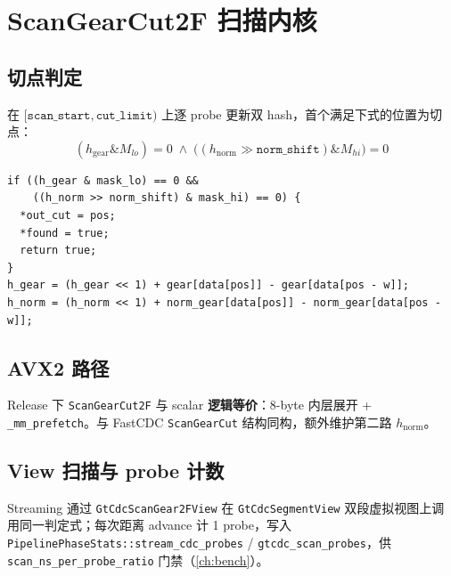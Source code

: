 \chapter{ScanGearCut2F 扫描内核}
\label{ch:scan-cut2f}

\section{切点判定}

在 $[\texttt{scan\_start}, \texttt{cut\_limit})$ 上逐 probe 更新双 hash，首个满足下式的位置为切点：
\begin{equation}
  (h_{\mathrm{gear}} \mathbin{\&} M_{lo}) = 0
  \;\land\;
  \bigl((h_{\mathrm{norm}} \gg \texttt{norm\_shift}) \mathbin{\&} M_{hi}\bigr) = 0
  \label{eq:2f-cut}
\end{equation}

\begin{lstlisting}[caption={ScanGearCut2F 核心循环（scalar 节选）},label={lst:scan2f}]
if ((h_gear & mask_lo) == 0 &&
    ((h_norm >> norm_shift) & mask_hi) == 0) {
  *out_cut = pos;
  *found = true;
  return true;
}
h_gear = (h_gear << 1) + gear[data[pos]] - gear[data[pos - w]];
h_norm = (h_norm << 1) + norm_gear[data[pos]] - norm_gear[data[pos - w]];
\end{lstlisting}

\section{AVX2 路径}

Release 下 \texttt{ScanGearCut2F} 与 scalar \textbf{逻辑等价}：8-byte 内层展开 + \texttt{\_mm\_prefetch}。与 FastCDC \texttt{ScanGearCut} 结构同构，额外维护第二路 $h_{\mathrm{norm}}$。

\section{View 扫描与 probe 计数}

Streaming 通过 \texttt{GtCdcScanGear2FView} 在 \texttt{GtCdcSegmentView} 双段虚拟视图上调用同一判定式；每次距离 advance 计 1 probe，写入 \texttt{PipelinePhaseStats::stream\_cdc\_probes} / \texttt{gtcdc\_scan\_probes}，供 \texttt{scan\_ns\_per\_probe\_ratio} 门禁（\cref{ch:bench}）。

